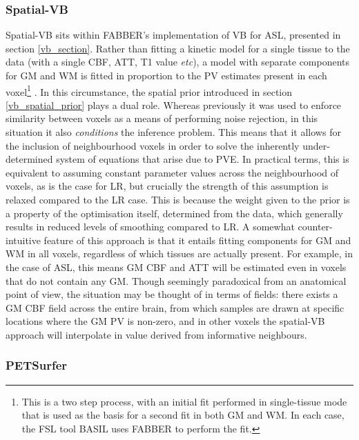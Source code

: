 \documentclass[12pt]{report}
\begin{document}
\subsubsection{Spatial-VB}
\label{fabber_pvec}

Spatial-VB sits within FABBER's implementation of VB for ASL, presented in section \ref{vb_section}. Rather than fitting a kinetic model for a single tissue to the data (with a single CBF, ATT, T1 value \textit{etc}), a model with separate components for GM and WM is fitted in proportion to the PV estimates present in each voxel\footnote{This is a two step process, with an initial fit performed in single-tissue mode that is used as the basis for a second fit in both GM and WM. In each case, the FSL tool BASIL uses FABBER to perform the fit.} \cite{Chappell2011}. In this circumstance, the spatial prior introduced in section \ref{vb_spatial_prior} plays a dual role. Whereas previously it was used to enforce similarity between voxels as a means of performing noise rejection, in this situation it also \textit{conditions} the inference problem. This means that it allows for the inclusion of neighbourhood voxels in order to solve the inherently under-determined system of equations that arise due to PVE. In practical terms, this is equivalent to assuming constant parameter values across the neighbourhood of voxels, as is the case for LR, but crucially the strength of this assumption is relaxed compared to the LR case. This is because the weight given to the prior is a property of the optimisation itself, determined from the data, which generally results in reduced levels of smoothing compared to LR. A somewhat counter-intuitive feature of this approach is that it entails fitting components for GM and WM in all voxels, regardless of which tissues are actually present. For example, in the case of ASL, this means GM CBF and ATT will be estimated even in voxels that do not contain any GM. Though seemingly paradoxical from an anatomical point of view, the situation may be thought of in terms of fields: there exists a GM CBF field across the entire brain, from which samples are drawn at specific locations where the GM PV is non-zero, and in other voxels the spatial-VB approach will interpolate in value derived from informative neighbours. 

\subsubsection{PETSurfer}
\end{document}
